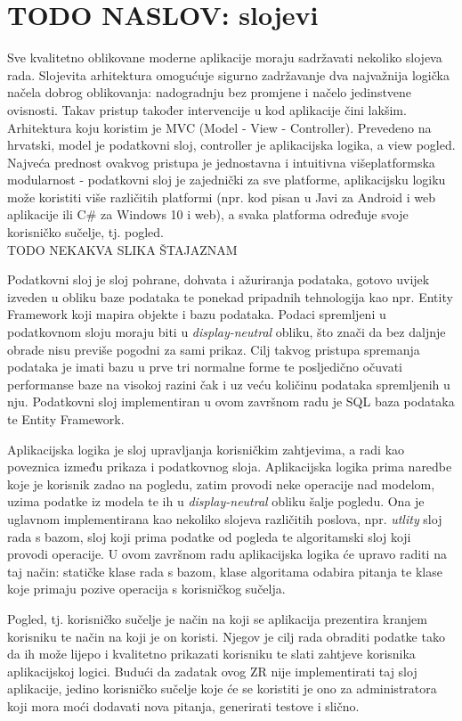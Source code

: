 \documentclass[times, utf8, zavrsni]{fer}
\begin{document}
\chapter{ TODO NASLOV: slojevi}
Sve kvalitetno oblikovane moderne aplikacije moraju sadržavati nekoliko slojeva rada. Slojevita arhitektura omogućuje sigurno zadržavanje dva najvažnija logička načela dobrog oblikovanja: nadogradnju bez promjene i načelo jedinstvene ovisnosti. Takav pristup također intervencije u kod aplikacije čini lakšim. Arhitektura koju koristim je MVC (Model - View - Controller). Prevedeno na hrvatski, model je podatkovni sloj, controller je aplikacijska logika, a view pogled. Najveća prednost ovakvog pristupa je jednostavna i intuitivna višeplatformska modularnost - podatkovni sloj je zajednički za sve platforme, aplikacijsku logiku može koristiti više različitih platformi (npr. kod pisan u Javi za Android i web aplikacije ili C\# za Windows 10 i web), a svaka platforma određuje svoje korisničko sučelje, tj. pogled.
\\TODO NEKAKVA SLIKA ŠTAJAZNAM
\par
Podatkovni sloj je sloj pohrane, dohvata i ažuriranja podataka, gotovo uvijek izveden u obliku baze podataka te ponekad pripadnih tehnologija kao npr. Entity Framework koji mapira objekte i bazu podataka. Podaci spremljeni u podatkovnom sloju moraju biti u \textit{display-neutral} obliku, što znači da bez daljnje obrade nisu previše pogodni za sami prikaz. Cilj takvog pristupa spremanja podataka je imati bazu u prve tri normalne forme te posljedično očuvati performanse baze na visokoj razini čak i uz veću količinu podataka spremljenih u nju. Podatkovni sloj implementiran u ovom završnom radu je SQL baza podataka te Entity Framework.
\par
Aplikacijska logika je sloj upravljanja korisničkim zahtjevima, a radi kao poveznica između prikaza i podatkovnog sloja. Aplikacijska logika prima naredbe koje je korisnik zadao na pogledu, zatim provodi neke operacije nad modelom, uzima podatke iz modela te ih u \textit{display-neutral} obliku šalje pogledu. Ona je uglavnom implementirana kao nekoliko slojeva različitih poslova, npr. \textit{utlity} sloj rada s bazom, sloj koji prima podatke od pogleda te algoritamski sloj koji provodi operacije. U ovom završnom radu aplikacijska logika će upravo raditi na taj način: statičke klase rada s bazom, klase algoritama odabira pitanja te klase koje primaju pozive operacija s korisničkog sučelja.
\par
Pogled, tj. korisničko sučelje je način na koji se aplikacija prezentira kranjem korisniku te način na koji je on koristi. Njegov je cilj rada obraditi podatke tako da ih može lijepo i kvalitetno prikazati korisniku te slati zahtjeve korisnika aplikacijskoj logici. Budući da zadatak ovog ZR nije implementirati taj sloj aplikacije, jedino korisničko sučelje koje će se koristiti je ono za administratora koji mora moći dodavati nova pitanja, generirati testove i slično.
\end{document}
